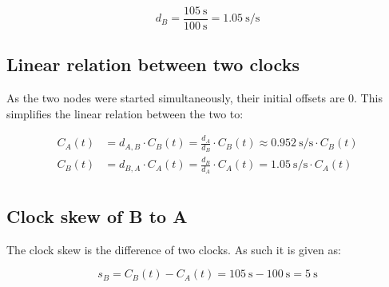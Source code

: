 \documentclass[a4paper]{scrreprt}
\begin{document}
\[
		d_B = \frac{\SI{105}{\s}}{\SI{100}{\s}} = \SI{1.05}{\s \per \s}
\]

\subsection{Linear relation between two clocks}

As the two nodes were started simultaneously, their initial offsets are $0$.
This simplifies the linear relation between the two to:

\begin{align*}
		C_A(t) & = d_{A, B} \cdot C_B(t) = \frac{d_A}{d_B} \cdot C_B(t) \approx \SI{0.952}{\s \per \s} \cdot C_B(t) \\
		C_B(t) & = d_{B, A} \cdot C_A(t) = \frac{d_B}{d_A} \cdot C_A(t) = \SI{1.05}{\s \per \s} \cdot C_A(t) \\
\end{align*}

\subsection{Clock skew of B to A}

The clock skew is the difference of two clocks. As such it is given as:

\[
		s_B = C_B(t) - C_A(t) = \SI{105}{\s} - \SI{100}{\s} = \SI{5}{\s}
\]
\end{document}
